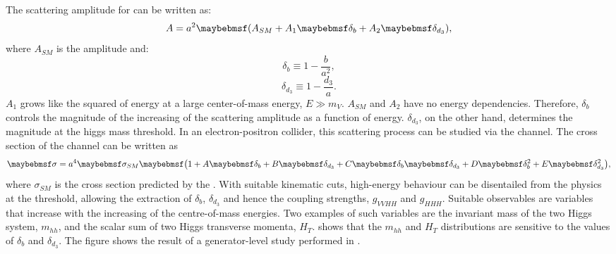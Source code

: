 The scattering amplitude for  can be written as:
\begin{equation}
A = a^2\parenths{A_{SM} + A_1\delta_b + A_2\delta_{d_3}},
\end{equation}
where $A_{SM}$ is the \SM amplitude and:
\begin{equation}
\delta_b \equiv 1 - \frac{b}{a^2},
\end{equation}
\begin{equation}
\delta_{d_3} \equiv 1 - \frac{d_3}{a}.
\end{equation}
$A_1$ grows like the squared of energy at a large center-of-mass energy, $E\gg{m_V}$. $A_{SM}$ and $A_2$ have no energy dependencies. Therefore, $\delta_b$ controls the magnitude of the increasing of the scattering amplitude as a function of energy. $\delta_{d_3}$, on the other hand, determines the magnitude at the higgs mass threshold. In an electron-positron collider, this scattering process can be studied via the  channel. The cross section of the channel can be written as
\begin{equation}
\label{eq:theoryGeneralHiggsCrossSection}
\sigma = a^4\sigma_{SM}\parenths{1 + A\delta_b + B\delta_{d_3} + C\delta_b\delta_{d_3} + D\delta_b^2 + E\delta_{d_3}^2},
\end{equation}
where $\sigma_{SM}$ is the cross section predicted by the \SM. With suitable kinematic cuts, high-energy behaviour can be disentailed from the physics at the threshold, allowing the extraction of $\delta_{b}$, $\delta_{d_3}$ and hence the coupling strengths, $g_{VVHH}$ and $g_{HHH}$. Suitable observables are variables that increase with the increasing of the centre-of-mass energies. Two examples of such variables are the invariant mass of the two Higgs system, $m_{hh}$, and the scalar sum of two Higgs transverse momenta, $H_T$.  shows that the $m_{hh}$ and $H_T$ distributions are sensitive to the values of $\delta_{b}$ and $\delta_{d_3}$. The figure shows the result of a generator-level study performed in \cite{Contino:2013gna}.

